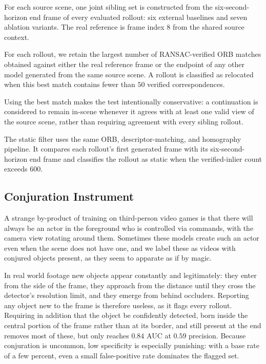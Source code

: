 \documentclass[letterpaper]{article} %
\begin{document}
For each source scene, one joint sibling set is constructed from the
six-second-horizon end frame of every evaluated rollout: six external
baselines and seven ablation variants. The real reference is frame index $8$
from the shared source context.

For each rollout, we retain the largest number of RANSAC-verified ORB matches
obtained against either the real reference frame or the endpoint of any other
model generated from the same source scene. A rollout is classified as
relocated when this best match contains fewer than $50$ verified
correspondences.

Using the best match makes the test intentionally conservative: a continuation
is considered to remain in-scene whenever it agrees with at least one valid
view of the source scene, rather than requiring agreement with every sibling
rollout.

The static filter uses the same ORB, descriptor-matching, and homography
pipeline. It compares each rollout's first generated frame with its
six-second-horizon end frame and classifies the rollout as static when the
verified-inlier count exceeds $600$.


\subsection{Conjuration Instrument}
\label{app:conjuration_instrument}

A strange by-product of training on third-person video games is that there will always be an
actor in the foreground who is controlled via commands, with the camera view rotating around
them. Sometimes these models create such an actor even when the scene does not have one, and we
label these as videos with conjured objects present, as they seem to apparate as if by magic.

In real world footage new objects appear constantly and legitimately: they enter from the side of
the frame, they approach from the distance until they cross the detector's resolution limit,
and they emerge from behind occluders. Reporting any object new to the frame is therefore
useless, as it flags every rollout. Requiring in addition
that the object be confidently detected, born inside the central portion of the frame rather
than at its border, and still present at the end removes most of these, but only reaches $0.84$
AUC at $0.59$ precision. Because conjuration is uncommon, low specificity is especially
punishing: with a base rate of a few percent, even a small false-positive rate dominates the
flagged set.
\end{document}
